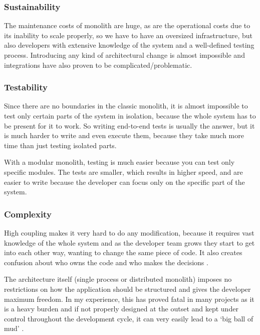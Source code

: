 
\subsubsection{Sustainability}
The maintenance costs of monolith are huge, as are the operational costs due to its inability to scale properly, so we have to have an oversized infrastructure, but also developers with extensive knowledge of the system and a well-defined testing process. Introducing any kind of architectural change is almost impossible and integrations have also proven to be complicated/problematic.

\subsubsection{Testability}
Since there are no boundaries in the classic monolith, it is almost impossible to test only certain parts of the system in isolation, because the whole system has to be present for it to work. So writing end-to-end tests is usually the answer, but it is much harder to write and even execute them, because they take much more time than just testing isolated parts.

With a modular monolith, testing is much easier because you can test only specific modules. The tests are smaller, which results in higher speed, and are easier to write because the developer can focus only on the specific part of the system.

\subsubsection{Complexity}
High coupling makes it very hard to do any modification, because it requires vast knowledge of the whole system and as the developer team grows they start to get into each other way, wanting to change the same piece of code. It also creates confusion about who owns the code and who makes the decisions \cite{MON_TO_MS_MONOLITH}.

The architecture itself (single process or distributed monolith) imposes no restrictions on how the application should be structured and gives the developer maximum freedom. In my experience, this has proved fatal in many projects as it is a heavy burden and if not properly designed at the outset and kept under control throughout the development cycle, it can very easily lead to a `big ball of mud' \cite{BIG_BALL_OF_MUD}.

